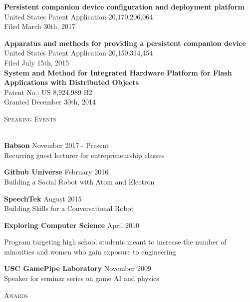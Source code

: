 \documentclass[a4paper]{article}
\newcommand{\lineunder} {
    \vspace*{-8pt} \\
    \hspace*{-18pt} \hrulefill \\
}
\newcommand{\header} [1] {
    {\hspace*{-18pt}\vspace*{6pt} \textsc{#1}}
    \vspace*{-6pt} \lineunder
    \vspace{2mm}
}
\begin{document}
\textbf{Persistent companion device configuration and deployment platform}\\
United States Patent Application 20,170,206,064\\
Filed March 30th, 2017
\vspace*{2mm}

\textbf{Apparatus and methods for providing a persistent companion device}\\
United States Patent Application 20,150,314,454\\
Filed July 15th, 2015\\

\vspace*{2mm}
\textbf{System and Method for Integrated Hardware Platform for Flash Applications
with Distributed Objects}\\
Patent No.: US 8,924,989 B2\\
Granted December 30th, 2014 \\
\vspace*{4mm}

\pagebreak[3]

\header{Speaking Events}
\textbf{Babson} \hfill November 2017 - Present\\
Recurring guest lecturer for entrepreneurship classes 
\vspace*{2mm}

\textbf{Github Universe} \hfill February 2016\\
Building a Social Robot with Atom and Electron 
\vspace*{2mm}

\textbf{SpeechTek} \hfill August 2015\\
Building Skills for a Conversational Robot
\vspace*{2mm}

\pagebreak[3]

\textbf{Exploring Computer Science} \hfill April 2010\\
\begin{addmargin}[0em]{4em}
Program targeting high school students meant to increase the number of
minorities and women who gain exposure to engineering
\end{addmargin}
\vspace*{2mm}

\textbf{USC GamePipe Laboratory} \hfill November 2009\\
Speaker for seminar series on game AI and physics 
\vspace*{4mm}

\header{Awards}
\end{document}

